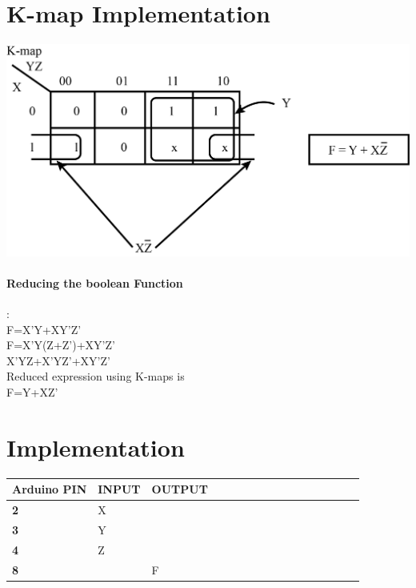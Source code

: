 \documentclass[10pt, a4paper]{article}
\begin{document}
\section{K-map Implementation}
\begin{center}
    \includegraphics[scale=0.5]{img.png}
\end{center}


 \paragraph {Reducing the boolean Function}:\\
    F=X'Y+XY'Z'\\
    F=X'Y(Z+Z')+XY'Z'\\
    X'YZ+X'YZ'+XY'Z'\\
 Reduced expression using K-maps is\\
 F=Y+XZ'\\

    
\section{Implementation}
  \begin{tabularx}{0.46\textwidth} { 
  | >{\centering\arraybackslash}X 
  | >{\centering\arraybackslash}X 
  | >{\centering\arraybackslash}X
  | >{\centering\arraybackslash}X 
  | >{\centering\arraybackslash}X 
  | >{\centering\arraybackslash}X 
  | >{\centering\arraybackslash}X 
  | >{\centering\arraybackslash}X 
  | >{\centering\arraybackslash}X
  | >{\centering\arraybackslash}X
  | >{\centering\arraybackslash}X
  | >{\centering\arraybackslash}X
  | >{\centering\arraybackslash}X
  | >{\centering\arraybackslash}X
  | >{\centering\arraybackslash}X 
  | >{\centering\arraybackslash}X | }


\hline
\textbf{Arduino PIN} & \textbf{INPUT} & \textbf{OUTPUT} \\ 
\hline
\textbf 2 & X & \\
\hline
\textbf 3 & Y & \\
\hline
\textbf 4 & Z & \\
\hline
\textbf 8 & & F \\
\hline
\end{tabularx}
\end{document}
